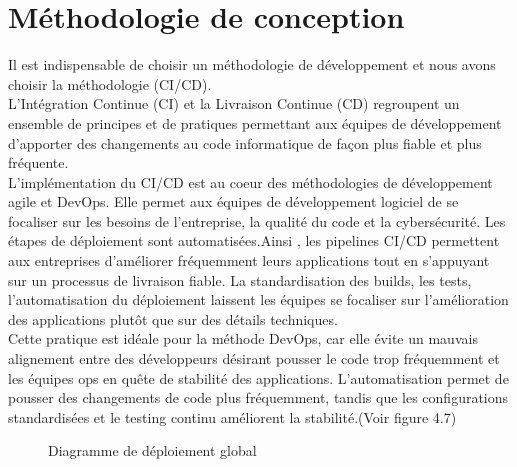 \section{\selectfont\Large Méthodologie de conception}
\textsf{\selectfont{}Il est indispensable de choisir un méthodologie de développement  et nous avons choisir la méthodologie (CI/CD). \\
L’Intégration Continue (CI) et la Livraison Continue (CD) regroupent un ensemble de principes et de pratiques permettant aux équipes de développement d’apporter des changements au code informatique de façon plus fiable et plus fréquente.\\
L’implémentation du CI/CD est au coeur des méthodologies de développement agile et DevOps. Elle permet aux équipes de développement logiciel de se focaliser sur les besoins de l’entreprise, la qualité du code et la cybersécurité. Les étapes de déploiement sont automatisées.Ainsi , les pipelines CI/CD permettent aux entreprises d’améliorer fréquemment leurs applications tout en s’appuyant sur un processus de livraison fiable. La standardisation des builds, les tests, l’automatisation du déploiement laissent les équipes se focaliser sur l’amélioration des applications plutôt que sur des détails techniques.\\
Cette pratique est idéale pour la méthode DevOps, car elle évite un mauvais alignement entre des développeurs désirant pousser le code trop fréquemment et les équipes ops en quête de stabilité des applications. L’automatisation permet de pousser des changements de code plus fréquemment, tandis que les configurations standardisées et le testing continu améliorent la stabilité.\cite{20}(Voir figure 4.7)}\\[0.1cm]
\begin{figure}[H]
  \begin{center}
  

  \end{center}
  
  \caption{Diagramme de déploiement global}
\end{figure}
